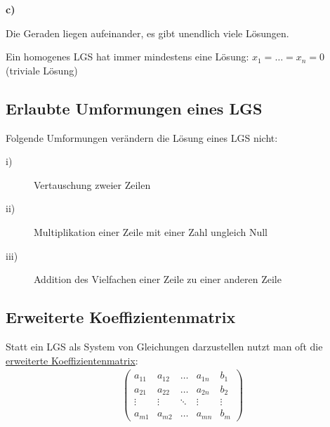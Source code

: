 \begin{samepage}
\textbf{c)}
\begin{center}
\end{center}
Die Geraden liegen aufeinander, es gibt unendlich viele Lösungen.
\end{samepage}

Ein homogenes LGS hat immer mindestens eine Lösung: $x_1 = \dots = x_n = 0$ (triviale Lösung)

\subsection{Erlaubte Umformungen eines LGS}
Folgende Umformungen verändern die Lösung eines LGS nicht:

\begin{description}
\item[i)]{Vertauschung zweier Zeilen}
\item[ii)]{Multiplikation einer Zeile mit einer Zahl ungleich Null}
\item[iii)]{Addition des Vielfachen einer Zeile zu einer anderen Zeile}
\end{description}

\subsection{Erweiterte Koeffizientenmatrix}
Statt ein LGS als System von Gleichungen darzustellen nutzt man oft die \ul{erweiterte Koeffizientenmatrix}:
\begin{align*}
    \left(\begin{array}{cccc|c}
        a_{11} & a_{12} & \dots & a_{1n} & b_1 \\
        a_{21} & a_{22} & \dots & a_{2n} & b_2 \\
        \vdots & \vdots & \ddots & \vdots & \vdots \\
        a_{m1} & a_{m2} & \dots & a_{mn} & b_m
    \end{array}\right)
\end{align*}

